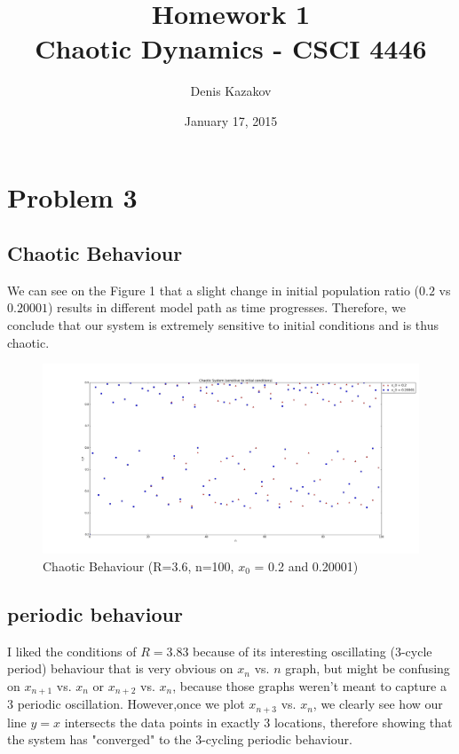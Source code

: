 \documentclass[12pt]{article}\pagestyle{myheadings}
\title{Homework 1 \\ Chaotic Dynamics - CSCI 4446}
\author{Denis Kazakov}
\date{January 17, 2015}
\theoremstyle{plain}
\begin{document}
\maketitle


\section{Problem 3}
\subsection{Chaotic Behaviour}

We can see on the Figure 1 that a slight change in initial population ratio ($0.2$ vs $0.20001$) results in different model path as time progresses. Therefore, we conclude that our system is extremely sensitive to initial conditions and is thus chaotic. 

\begin{figure}[h!]
\centering
\includegraphics[scale=.3]{chaos}
\caption{Chaotic Behaviour (R=3.6, n=100, $x_0$ = 0.2 and 0.20001)}
\label{fig:my_label}
\end{figure}

\clearpage
\subsection{periodic behaviour}

I liked the conditions of $R=3.83$ because of its interesting oscillating (3-cycle period) behaviour that is very obvious on $x_n$ vs. $n$ graph, but might be confusing on $x_{n+1}$ vs. $x_n$ or $x_{n+2}$ vs. $x_n$, because those graphs weren't meant to capture a 3 periodic oscillation. However,once we plot $x_{n+3}$ vs. $x_n$, we clearly see how our line $y=x$ intersects the data points in exactly 3 locations, therefore showing that the system has "converged" to the 3-cycling periodic behaviour. 
\end{document}
